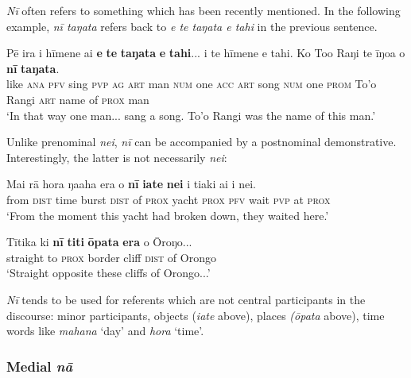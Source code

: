 \textit{Nī} often refers to something which has been recently mentioned. In the following example, \textit{nī taŋata} refers back to \textit{e te taŋata e tahi} in the previous sentence.

\ea\label{ex:4.222}
\gll Pē ira i hīmene ai \textbf{e} \textbf{te} \textbf{taŋata} \textbf{e} \textbf{tahi}... i te hīmene e tahi.  Ko To{\ꞌ}o Raŋi te {\ꞌ}īŋoa o \textbf{nī} \textbf{taŋata}.\\
like \textsc{ana} \textsc{pfv} sing \textsc{pvp} \textsc{ag} \textsc{art} man \textsc{num} one \textsc{acc} \textsc{art} song \textsc{num} one  \textsc{prom} To’o Rangi \textsc{art} name of \textsc{prox} man\\

\glt
‘In that way one man... sang a song. To’o Rangi was the name of this man.’ \textstyleExampleref{[R539-1.127–128]}
\z

Unlike prenominal \textit{nei}, \textit{nī} can be accompanied by a postnominal demonstrative. Interestingly, the latter is not necessarily \textit{nei}:

\ea\label{ex:4.223}
\gll Mai rā hora ŋa{\ꞌ}aha era o \textbf{nī} \textbf{iate} \textbf{nei} i tiaki ai {\ꞌ}i nei. \\
from \textsc{dist} time burst \textsc{dist} of \textsc{prox} yacht \textsc{prox} \textsc{pfv} wait \textsc{pvp} at \textsc{prox} \\

\glt 
‘From the moment this yacht had broken down, they waited here.’ \textstyleExampleref{[R539-1.686]}
\z

\ea\label{ex:4.224}
\gll Tītika ki \textbf{nī} \textbf{titi} \textbf{{\ꞌ}ōpata} \textbf{era} o {\ꞌ}Ōroŋo... \\
straight to \textsc{prox} border cliff \textsc{dist} of Orongo \\

\glt
‘Straight opposite these cliffs of Orongo...’ \textstyleExampleref{[R112.008]} 
\z

\textit{Nī} tends to be used for referents which are not central participants in the discourse: minor participants, objects (\textit{iate} above), places \textit{({\ꞌ}ōpata} above), time words like \textit{mahana} ‘day’ and \textit{hora} ‘time’.
\subsubsection[Medial nā]{Medial \textit{nā}}\label{sec:4.6.4.4}

